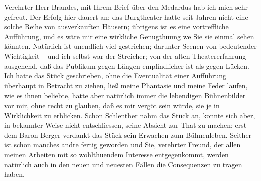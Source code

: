 \pstart{}Verehrter Herr Brandes,\pend\vspace{0.5em}
\pstart
           mit Ihrem Brief über den Medardus hab ich mich
               sehr gefreut. Der Erfolg hier dauert an; das Burgtheater hatte seit Jahren nicht eine solche Reihe von ausverkauften
               Häusern; übrigens ist es eine vortreffliche Aufführung, und es wäre mir eine
               wirkliche Genugthuung we{\geminationn} Sie sie einmal sehen könnten.
               Natürlich ist unendlich viel gestrichen; darunter Scenen von bedeutender Wichtigkeit
               – und ich selbst war der Streicher; von der alten Theatererfahrung ausgehend, daß das
               Publikum gegen Längen empfindlicher ist als gegen Lücken. Ich hatte das Stück
               geschrieben, ohne die Eventualität einer Aufführung überhaupt in Betracht zu ziehen,
               ließ meine Phantasie und meine Feder laufen, wie es ihnen beliebte, {\pb}hatte aber natürlich immer die lebendigen
               Bühnenbilder vor mir, ohne recht zu glauben, daß es mir vergö{\geminationn}t sein würde, sie je in Wirklichkeit zu erblicken.
               Schon Schlenther nahm das Stück an, konnte sich aber, in bekannter
               Weise nicht entschliessen, seine Absicht zur That zu machen; erst dem Baron Berger verdankt  das Stück sein
               Erwachen zum Bühnenleben. Seither ist schon manches andre fertig geworden und Sie,
               verehrter Freund, der allen meinen Arbeiten mit so wohlthuendem Interesse
               entgegenkommt, werden natürlich auch in den neuen und neuesten Fällen die
               Consequenzen zu tragen haben. –\pend
           
